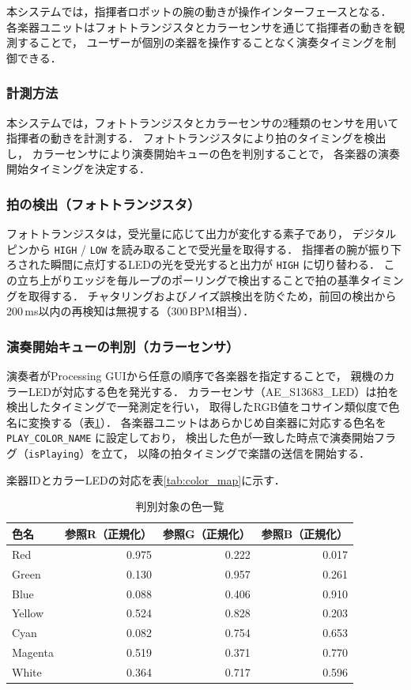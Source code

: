 本システムでは，指揮者ロボットの腕の動きが操作インターフェースとなる．
各楽器ユニットはフォトトランジスタとカラーセンサを通じて指揮者の動きを観測することで，
ユーザーが個別の楽器を操作することなく演奏タイミングを制御できる．

\subsubsection*{計測方法}
本システムでは，フォトトランジスタとカラーセンサの2種類のセンサを用いて
指揮者の動きを計測する．
フォトトランジスタにより拍のタイミングを検出し，
カラーセンサにより演奏開始キューの色を判別することで，
各楽器の演奏開始タイミングを決定する．

\subsubsection*{拍の検出（フォトトランジスタ）}
フォトトランジスタは，受光量に応じて出力が変化する素子であり，
デジタルピンから \texttt{HIGH} / \texttt{LOW} を読み取ることで受光量を取得する．
指揮者の腕が振り下ろされた瞬間に点灯するLEDの光を受光すると出力が \texttt{HIGH} に切り替わる．
この立ち上がりエッジを毎ループのポーリングで検出することで拍の基準タイミングを取得する．
チャタリングおよびノイズ誤検出を防ぐため，前回の検出から200\,ms以内の再検知は無視する（300\,BPM相当）．

\subsubsection*{演奏開始キューの判別（カラーセンサ）}
演奏者がProcessing GUIから任意の順序で各楽器を指定することで，
親機のカラーLEDが対応する色を発光する．
カラーセンサ（AE\_S13683\_LED）は拍を検出したタイミングで一発測定を行い，
取得したRGB値をコサイン類似度で色名に変換する（表\ref{tab:detect_colors}）．
各楽器ユニットはあらかじめ自楽器に対応する色名を \texttt{PLAY\_COLOR\_NAME} に設定しており，
検出した色が一致した時点で演奏開始フラグ（\texttt{isPlaying}）を立て，
以降の拍タイミングで楽譜の送信を開始する．

楽器IDとカラーLEDの対応を表\ref{tab:color_map}に示す．

\begin{table}[H]
\centering
\caption{判別対象の色一覧}
\label{tab:detect_colors}
\begin{tabular}{lrrr}
\hline
色名 & 参照R（正規化） & 参照G（正規化） & 参照B（正規化） \\\hline
Red     & 0.975 & 0.222 & 0.017 \\
Green   & 0.130 & 0.957 & 0.261 \\
Blue    & 0.088 & 0.406 & 0.910 \\
Yellow  & 0.524 & 0.828 & 0.203 \\
Cyan    & 0.082 & 0.754 & 0.653 \\
Magenta & 0.519 & 0.371 & 0.770 \\
White   & 0.364 & 0.717 & 0.596 \\\hline
\end{tabular}
\end{table}


